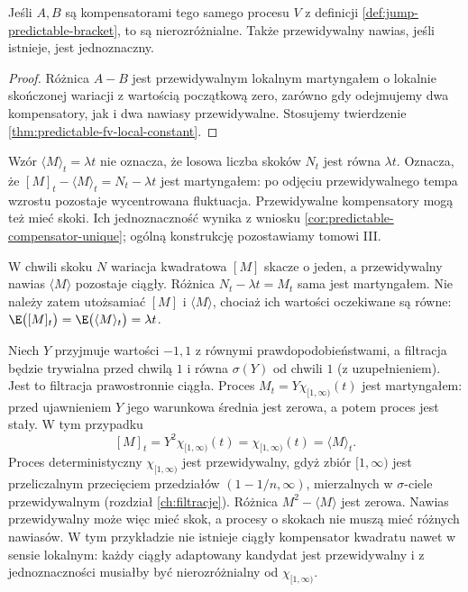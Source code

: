\begin{wniosek}
\label{cor:predictable-compensator-unique}
Jeśli $A,B$ są kompensatorami tego samego
procesu $V$ z definicji
\ref{def:jump-predictable-bracket}, to są
nierozróżnialne. Także przewidywalny nawias,
jeśli istnieje, jest jednoznaczny.
\end{wniosek}
\begin{proof}
Różnica $A-B$ jest przewidywalnym lokalnym
martyngałem o lokalnie skończonej wariacji
z wartością początkową zero, zarówno gdy
odejmujemy dwa kompensatory, jak i dwa nawiasy
przewidywalne. Stosujemy twierdzenie
\ref{thm:predictable-fv-local-constant}.
\end{proof}

\begin{uwaga}
Wzór $\langle M\rangle_t=\lambda t$ nie oznacza,
że losowa liczba skoków $N_t$ jest równa $\lambda t$.
Oznacza, że $[M]_t-\langle M\rangle_t=N_t-\lambda t$
jest martyngałem: po odjęciu przewidywalnego tempa
wzrostu pozostaje wycentrowana fluktuacja.
Przewidywalne kompensatory mogą też mieć skoki.
Ich jednoznaczność wynika z wniosku
\ref{cor:predictable-compensator-unique};
ogólną konstrukcję pozostawiamy tomowi III.
\end{uwaga}


\begin{uwaga}
W chwili skoku $N$ wariacja kwadratowa $[M]$ skacze
o jeden, a przewidywalny nawias $\langle M\rangle$
pozostaje ciągły. Różnica $N_t-\lambda t=M_t$
sama jest martyngałem. Nie należy zatem utożsamiać
$[M]$ i $\langle M\rangle$, chociaż ich wartości
oczekiwane są równe: $\E\bigl([M]_t\bigr)=\E\bigl(\langle M\rangle_t\bigr)=\lambda t$.
\end{uwaga}

\begin{przyklad}
\label{ex:predictable-bracket-jump}
Niech $Y$ przyjmuje wartości $-1,1$ z równymi
prawdopodobieństwami, a filtracja będzie trywialna
przed chwilą $1$ i równa $\sigma(Y)$ od chwili $1$
(z uzupełnieniem). Jest to filtracja prawostronnie
ciągła. Proces $M_t=Y\chi_{[1,\infty)}(t)$
jest martyngałem: przed ujawnieniem $Y$ jego
warunkowa średnia jest zerowa, a potem proces
jest stały.
W tym przypadku
\[
[M]_t=Y^2\chi_{[1,\infty)}(t)
=\chi_{[1,\infty)}(t)=\langle M\rangle_t.
\]
Proces deterministyczny $\chi_{[1,\infty)}$
jest przewidywalny, gdyż zbiór $[1,\infty)$
jest przeliczalnym przecięciem przedziałów
$(1-1/n,\infty)$, mierzalnych w
$\sigma$-ciele przewidywalnym (rozdział
\ref{ch:filtracje}). Różnica
$M^2-\langle M\rangle$ jest zerowa.
Nawias przewidywalny może więc mieć skok,
a procesy o skokach nie muszą mieć różnych
nawiasów. W tym przykładzie nie istnieje ciągły
kompensator kwadratu nawet w sensie lokalnym:
każdy ciągły adaptowany kandydat jest
przewidywalny i z jednoznaczności musiałby
być nierozróżnialny od $\chi_{[1,\infty)}$.
\end{przyklad}

